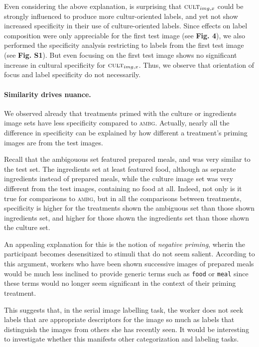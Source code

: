 \documentclass[a4paper]{report}
\begin{document}
Even considering the above explanation, is surprising that 
$\textsc{cult}_{img,x}$ could be strongly influenced to produce more 
cultur-oriented labels, and yet not show increased 
specificity in their use of culture-oriented labels.  Since effects on 
label composition were only appreciable for the first test image 
(see \textbf{Fig. 4}), we also
performed the specificity analysis restricting to labels from the first
test image (see \textbf{Fig. S1}).  But even focusing on the first test image
shows no significant increase in cultural specificity for 
$\textsc{cult}_{img,x}$.  Thus, we observe that orientation of focus and 
label specificity do not necessarily.


\paragraph{Similarity drives nuance.}
We observed already that treatments primed with the 
culture or ingredients image sets have less specificity compared to 
\textsc{ambg}.  Actually, nearly all the difference in specificity
can be explained by how different a treatment's priming images are from the 
test images.  

Recall that the ambigouous set featured prepared meals, and 
was very similar to the test set.  The ingredients set at least featured 
food, although as separate ingredients instead of prepared meals, while the
culture image set was very different from the test images, containing no food
at all.
Indeed, not only is it true for comparisons to \textsc{ambg}, but in all the 
comparisons between treatments, specificity is higher for the 
treatments shown the ambiguous set than those shown ingredients set, 
and higher for those shown the ingredients set than those shown the culture 
set.

An appealing explanation for 
this is the notion of \textit{negative priming}, wherin the participant
becomes desensitized to stimuli that do not seem salient.  According to this 
argument, workers who have been shown successive images of prepared meals 
would be much less inclined to provide generic terms such as \texttt{food} or 
\texttt{meal} since these terms would no longer seem significant in the 
context of their priming treatment.  

This suggests that, in the serial image labelling task, the worker
does not seek labels that are appropriate descriptors for the image so much 
as labels that distinguish the images from others she has recently seen.
It would be interesting to investigate whether this manifests other 
categorization and labeling tasks.
\end{document}
